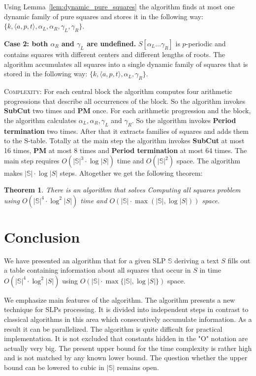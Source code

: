 \documentclass[10pt]{article}
\newtheorem{thm}{Theorem}[section]
\newcommand{\prog}[3]{\langle #1, #2, #3\rangle}
\newcommand{\slp}[1]{\mathbb{#1}}
\newcommand{\substr}[2]{[#1\dots#2]}
\begin{document}
Using Lemma~\ref{lem:dynamic_pure_squares} the algorithm finds at most one dynamic family of pure squares and stores
it in the following way: $\{k, \prog{a}{p}{t}, \alpha_L, \alpha_R, \gamma_L, \gamma_R\}$. 

\noindent \textbf{Case 2: both {\boldmath $\alpha_R$} and {\boldmath $\gamma_L$} are undefined.}
$S\substr{\alpha_L}{\gamma_R}$ is $p$-periodic and contains squares with different centers and different lengths of
roots. The algorithm accumulates all squares into a single dynamic family of squares that is stored in the following way: $\{k,
\prog{a}{p}{t}, \alpha_L, \gamma_R\}$.

\noindent \textsc{Complexity:} For each central block the algorithm computes four arithmetic progressions that describe all 
occurrences of the block. So the algorithm invokes \textbf{SubCut} two times and \textbf{PM} once. For each arithmetic progression and the
block, the algorithm calculates $\alpha_L, \alpha_R, \gamma_L$ and $\gamma_R$. So the algorithm invokes
\textbf{Period termination} two times. After that it extracts families of squares and adds them to the S-table. Totally at
the main step the algorithm invokes \textbf{SubCut} at most 16 times, \textbf{PM} at most 8 times and \textbf{Period termination} at
most 64 times. The main step requires $O(|\slp{S}|^3 \cdot \log |S|)$ time and $O(|\slp{S}|^2)$ space. The algorithm
makes $|\slp{S}| \cdot \log |S|$ steps. Altogether we get the following theorem:

\begin{thm}
There is an algorithm that solves Computing all squares problem using $O(|\slp{S}|^4 \cdot \log^2{|S|})$ time and
$O(|\slp{S}| \cdot \max(|\slp{S}|, \log{|S|}))$ space.
\end{thm}

\section{Conclusion}

We have presented an algorithm that for a given SLP $\slp{S}$ deriving a text $S$ fills out a table containing
information about all squares that occur in $S$ in time $O(|\slp{S}|^4\cdot \log^2{|S|})$ using
$O(|\slp{S}|\cdot \max\{ |\slp{S}|, \log{|S|}\})$ space. 

We emphasize main features of the algorithm. The algorithm presents a new technique for SLPs processing. 
It is divided into independent steps in contrast to classical algorithms in this area which consecutively accumulate information. 
As a result it can be parallelized. The algorithm is quite difficult for practical implementation. 
It is not excluded that constants hidden in the "O" notation are actually very big. The present upper bound for the time complexity 
is rather high and is not matched by any known lower bound. The question whether the upper bound can be lowered to cubic in $|\mathbb{S}|$ 
remains open.

{\footnotesize
{}

}
\end{document}
